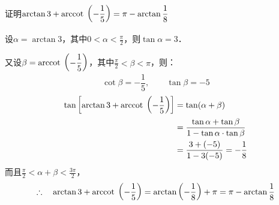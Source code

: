 \begin{example}
    证明$\arctan 3+{\rm arccot\; }\left(-\dfrac{1}{5}\right)=\pi-\arctan\dfrac{1}{8}$
\end{example}

\begin{solution}
设$\alpha=\arctan 3$，其中$0<\alpha<\frac{\pi}{2}$，则$\tan\alpha=3$．

又设$\beta={\rm arccot\; }\left(-\dfrac{1}{5}\right)$，其中$\frac{\pi}{2}<\beta<\pi$，则：
\[\cot\beta=-\frac{1}{5},\qquad \tan\beta=-5\]
\[\begin{split}
 \tan\left[\arctan 3+{\rm arccot\; }\left(-\dfrac{1}{5}\right)\right]
&=\tan(\alpha+\beta)\\
&=\dfrac{\tan\alpha+\tan\beta}{1-\tan\alpha\cdot \tan\beta}\\
&=\dfrac{3+(-5)}{1-3(-5)}=-\dfrac{1}{8}
\end{split}\]
而且$\frac{\pi}{2}<\alpha+\beta<\frac{3\pi}{2}$，
\[\therefore\quad \arctan 3+{\rm arccot\; }\left(-\dfrac{1}{5}\right)=\arctan\left(-\dfrac{1}{8}\right)+\pi=\pi-\arctan\dfrac{1}{8}\]
\end{solution}

